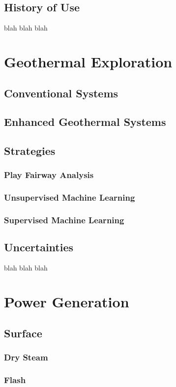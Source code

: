 \subsection{History of Use}
blah blah blah

\section{Geothermal Exploration}\label{ch2:geoexp}
\subsection{Conventional Systems}
\subsection{Enhanced Geothermal Systems}
\subsection{Strategies}
\subsubsection{Play Fairway Analysis}
\subsubsection{Unsupervised Machine Learning}
\subsubsection{Supervised Machine Learning}
\subsection{Uncertainties}
blah blah blah

\section{Power Generation}\label{ch2:elec}
\subsection{Surface}
\subsubsection{Dry Steam}
\subsubsection{Flash}
